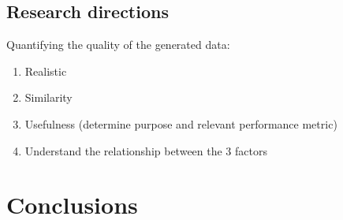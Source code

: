\documentclass[parskip=full]{scrartcl}
\begin{document}


% 

\subsection{Research directions}


Quantifying the quality of the generated data:

\begin{enumerate}
    \item Realistic
    \item Similarity
    \item Usefulness (determine purpose and relevant performance metric)
    \item Understand the relationship between the 3 factors
\end{enumerate}

\section{Conclusions}~\label{sec:conclusions}

\printbibliography
\end{document}
